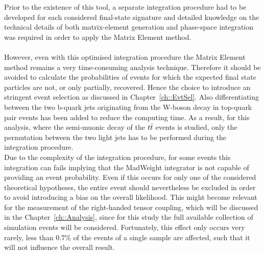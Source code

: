 Prior to the existence of this tool, a separate integration procedure had to be developed for each considered final-state signature and detailed knowledge on the technical details of both matrix-element generation and phase-space integration was required in order to apply the Matrix Element method.
\\
\\
However, even with this optimised integration procedure the Matrix Element method remains a very time-consuming analysis technique.
Therefore it should be avoided to calculate the probabilities of events for which the expected final state particles are not, or only partially, recovered.
Hence the choice to introduce an stringent event selection as discussed in Chapter~\ref{ch::EvtSel}.
Also differentiating between the two b-quark jets originating from the W-boson decay in top-quark pair events has been added to reduce the computing time.
As a result, for this analysis, where the semi-muonic decay of the $t\bar{t}$ events is studied, only the permutation between the two light jets has to be performed during the integration procedure. 
\\

Due to the complexity of the integration procedure, for some events this integration can fails implying that the MadWeight integrator is not capable of providing an event probability.
Even if this occurs for only one of the considered theoretical hypotheses, the entire event should nevertheless be excluded in order to avoid introducing a bias on the overall likelihood.
This might become relevant for the measurement of the right-handed tensor coupling, which will be discussed in the Chapter~\ref{ch::Analysis}, since for this study the full available collection of simulation events will be considered.
Fortunately, this effect only occurs very rarely, less than $0.7\%$ of the events of a single sample are affected, such that it will not influence the overall result.


